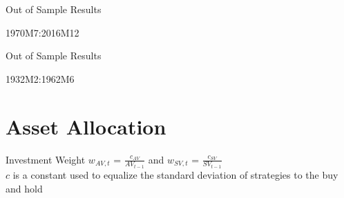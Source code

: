 \documentclass{beamer}
\begin{document}
\begin{frame}{Out of Sample Results}
	\vspace{-12pt}
	\begin{table}
		\caption{1970M7:2016M12}
		\vspace{-6pt}
		\begin{adjustbox}{width=\textwidth}
			
		\end{adjustbox}
	\end{table}
\end{frame}

\begin{frame}{Out of Sample Results}
	\vspace{-12pt}
	\begin{table}
		\caption{1932M2:1962M6}
		\vspace{-6pt}
		\begin{adjustbox}{width=\textwidth}
			
		\end{adjustbox}
	\end{table}
\end{frame}

\section{Asset Allocation}

\begin{frame}{Investment Weight}
	$w_{AV,t}$ = $\frac{c_{AV}}{AV_{t-1}}$ and $w_{SV,t}$ = $\frac{c_{SV}}{SV_{t-1}}$\\
	$c$ is a constant used to equalize the standard deviation of strategies to the buy and hold
	\begin{adjustbox}{width=\textwidth}
		
	\end{adjustbox}
	\begin{adjustbox}{width=\textwidth}
		
	\end{adjustbox}
\end{frame}
\end{document}
